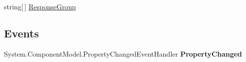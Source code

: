 \begin{DoxyCompactItemize}
\begin{DoxyCompactList}\small\item\em \end{DoxyCompactList}\item 
\hypertarget{class_price___comparison_1_1amazon_1_1ecs_1_1_cart_add_request_acf8ccf67bae93a1e9cea2bba604a559b}{string\mbox{[}$\,$\mbox{]} \hyperlink{class_price___comparison_1_1amazon_1_1ecs_1_1_cart_add_request_acf8ccf67bae93a1e9cea2bba604a559b}{Response\-Group}}\label{class_price___comparison_1_1amazon_1_1ecs_1_1_cart_add_request_acf8ccf67bae93a1e9cea2bba604a559b}

\begin{DoxyCompactList}\small\item\em \end{DoxyCompactList}\end{DoxyCompactItemize}
\subsection*{Events}
\begin{DoxyCompactItemize}
\item 
\hypertarget{class_price___comparison_1_1amazon_1_1ecs_1_1_cart_add_request_a73c40965f780c1498b135bcaa8cb64d5}{System.\-Component\-Model.\-Property\-Changed\-Event\-Handler {\bfseries Property\-Changed}}\label{class_price___comparison_1_1amazon_1_1ecs_1_1_cart_add_request_a73c40965f780c1498b135bcaa8cb64d5}

\end{DoxyCompactItemize}
